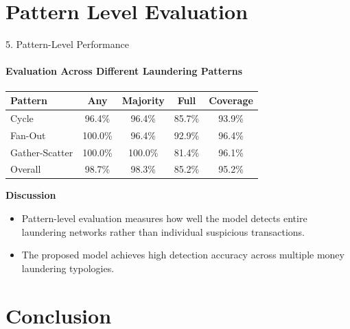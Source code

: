 \documentclass[aspectratio=169,11pt]{beamer}
\begin{document}

\section{Pattern Level Evaluation}

\begin{frame}{5. Pattern-Level Performance}

\framesubtitle{Evaluation Across Different Laundering Patterns}

\centering

\renewcommand{\arraystretch}{1.15}
\small

\begin{tabular}{lcccc}
\toprule
Pattern & Any & Majority & Full & Coverage\\
\midrule
Cycle & 96.4\% & 96.4\% & 85.7\% & 93.9\%\\
Fan-Out & 100.0\% & 96.4\% & 92.9\% & 96.4\%\\
Gather-Scatter & 100.0\% & 100.0\% & 81.4\% & 96.1\%\\
\midrule
Overall & 98.7\% & 98.3\% & 85.2\% & 95.2\%\\
\bottomrule
\end{tabular}

\vspace{0.3cm}

\raggedright
{\footnotesize
\textbf{Discussion}

\begin{itemize}\setlength{\itemsep}{3pt}\setlength{\parskip}{0pt}

\item Pattern-level evaluation measures how well the model detects entire laundering networks rather than individual suspicious transactions.

\item The proposed model achieves high detection accuracy across multiple money laundering typologies.

\end{itemize}
}

\end{frame}


\section{Conclusion}
\end{document}
